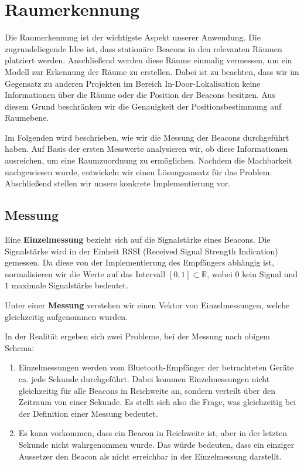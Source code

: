 \section{Raumerkennung}

Die Raumerkennung ist der wichtigste Aspekt unserer Anwendung.
Die zugrundeliegende Idee ist, dass stationäre Beacons in den
relevanten Räumen platziert werden. Anschließend werden diese
Räume einmalig vermessen, um ein Modell zur Erkennung der
Räume zu erstellen.
Dabei ist zu beachten, dass wir im Gegensatz zu anderen Projekten
im Bereich In-Door-Lokalisation keine Informationen über die
Räume oder die Position der Beacons besitzen. Aus diesem Grund
beschränken wir die Genauigkeit der Positionsbestimmung auf
Raumebene.

Im Folgenden wird beschrieben, wie wir die Messung der Beacons
durchgeführt haben. Auf Basis der ersten Messwerte analysieren
wir, ob diese Informationen ausreichen, um eine Raumzuordnung
zu ermöglichen. Nachdem die Machbarkeit nachgewiesen wurde,
entwickeln wir einen Lösungsansatz für das Problem.
Abschließend stellen wir unsere konkrete Implementierung vor.

\subsection{Messung}

Eine \textbf{Einzelmessung} bezieht sich auf die Signalstärke eines Beacons.
Die Signalstärke wird in der Einheit RSSI (Received Signal Strength Indication)
gemessen. Da diese von der Implementierung des Empfängers abhängig ist,
normalisieren wir die Werte auf das Intervall $[0, 1] \subset \mathbb{R}$, wobei
$0$ kein Signal und $1$ maximale Signalstärke bedeutet.

Unter einer \textbf{Messung} verstehen wir einen Vektor von Einzelmessungen,
welche gleichzeitig aufgenommen wurden.


In der Realität ergeben sich zwei Probleme, bei der Messung nach obigem
Schema:
\begin{enumerate}
	\item Einzelmessungen werden vom Bluetooth-Empfänger der betrachteten
	  Geräte ca. jede Sekunde durchgeführt. Dabei kommen Einzelmessungen nicht
	  gleichzeitig für alle Beacons in Reichweite an, sondern verteilt über
	  den Zeitraum von einer Sekunde. Es stellt sich also die Frage, was
	  gleichzeitig bei der Definition einer Messung bedeutet.
	\item Es kann vorkommen, dass ein Beacon in Reichweite ist, aber in der
	  letzten Sekunde nicht wahrgenommen wurde. Das würde bedeuten, dass ein
	  einziger Aussetzer den Beacon als nicht erreichbar in der Einzelmessung
	  darstellt.
\end{enumerate}

